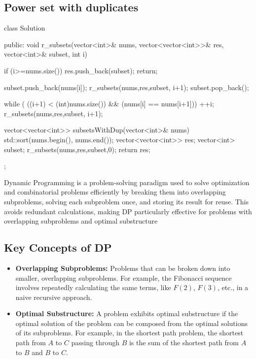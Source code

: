 \documentclass{report}
\begin{document}
\subsection{Power set with duplicates}
\bigbreak \noindent 
\begin{cppcode}
    class Solution {
        public:
        void r_subsets(vector<int>& nums, vector<vector<int>>& res, vector<int>& subset, int i) {
            if (i>=nums.size()) {
                res.push_back(subset);
                return;
            }

            subset.push_back(nums[i]);
            r_subsets(nums,res,subset, i+1);
            subset.pop_back();

            while ( ((i+1) < (int)nums.size()) && (nums[i] == nums[i+1])) {
                ++i;
            }
            r_subsets(nums,res,subset, i+1);
        }
        vector<vector<int>> subsetsWithDup(vector<int>& nums) {
            std::sort(nums.begin(), nums.end());
            vector<vector<int>> res;
            vector<int> subset;
            r_subsets(nums,res,subset,0);
            return res;
        }
    };
\end{cppcode}


\pagebreak 
{}
\bigbreak \noindent 
Dynamic Programming is a problem-solving paradigm used to solve optimization and combinatorial problems efficiently by breaking them into overlapping subproblems, solving each subproblem once, and storing its result for reuse. This avoids redundant calculations, making DP particularly effective for problems with overlapping subproblems and optimal substructure
\subsection{Key Concepts of DP}
\bigbreak \noindent 
\begin{itemize}
    \item \textbf{Overlapping Subproblems:} Problems that can be broken down into smaller, overlapping subproblems. For example, the Fibonacci sequence involves repeatedly calculating the same terms, like $F(2)$, $F(3)$, etc., in a naive recursive approach.
    \item \textbf{Optimal Substructure:} A problem exhibits optimal substructure if the optimal solution of the problem can be composed from the optimal solutions of its subproblems. For example, in the shortest path problem, the shortest path from $A$ to $C$ passing through $B$ is the sum of the shortest path from $A$ to $B$ and $B$ to $C$.
\end{itemize}
\bigbreak \noindent 
\end{document}
